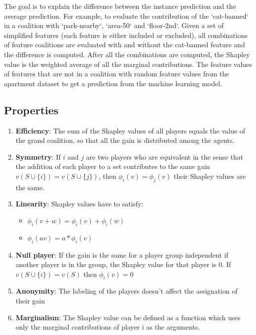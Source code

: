 The goal is to explain the difference between the instance prediction and the average prediction. For example, to evaluate the contribution of the `cat-banned` in a coalition with `park-nearby`, `area-50` and `floor-2nd`. Given a set of simplified features (each feature is either included or excluded), all combinations of feature coalitions are evaluated with and without the cat-banned feature and the difference is computed. After all the combinations are computed, the Shapley value is the weighted average of all the marginal contributions. The feature values of features that are not in a coalition with random feature values from the apartment dataset to get a prediction from the machine learning model.

\subsection{Properties}

\begin{enumerate}
    \item \textbf{Efficiency}: The sum of the Shapley values of all players equals the value of the grand coalition, so that all the gain is distributed among the agents.
    \item \textbf{Symmetry}: If $i$ and $j$ are two players who are equivalent in the sense that the addition of each player to a set contributes to the same gain $v(S \cup \{i\}) = v(S \cup \{j\})$, then $\phi_i(v) = \phi_j(v)$ their Shapley values are the same.
    \item \textbf{Linearity}: Shapley values have to satisfy: \begin{itemize}
        \item $\phi_i(v+w) = \phi_i(v) + \phi_i(w)$
        \item $\phi_i(av) = a*\phi_i(v)$
    \end{itemize}
    \item \textbf{Null player}: If the gain is the same for a player group independent if another player is in the group, the Shapley value for that player is 0. If $v(S\cup\{i\}) = v(S)$ then $\phi_i(v) = 0$
    \item \textbf{Anonymity}: The labeling of the players doesn't affect the assignation of their gain
    \item \textbf{Marginalism}: The Shapley value can be defined as a function which uses only the marginal contributions of player i as the arguments.
\end{enumerate}

